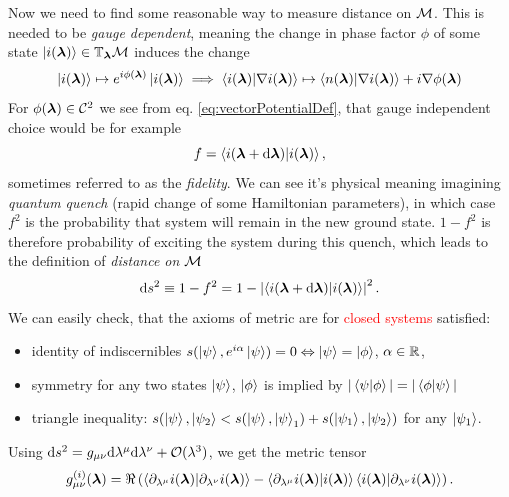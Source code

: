 Now we need to find some reasonable way to measure distance on $\mathcal{M}$. This is needed to be \emph{gauge dependent}, meaning the change in phase factor $\phi$ of some state $\ket{i({\bm\lambda})}\in \mathbb{T}_{\bm\lambda}\mathcal{M}$ induces the change 
\begin{equation}
    \ket{i({\bm\lambda})}\mapsto e^{i\phi({\bm\lambda})} \ket{i({\bm\lambda})} \implies \braket{i({\bm\lambda})|\nabla i({\bm\lambda})}\mapsto \braket{n({\bm\lambda})|\nabla i({\bm\lambda})} + i\nabla \phi({\bm\lambda}) 
\end{equation} 
For $\phi({\bm\lambda})\in \mathcal C^2$ we see from eq. \ref{eq:vectorPotentialDef}, that gauge independent choice would be for example
\begin{equation}
    f=\braket{i(\bm{{\bm\lambda}}+\mathrm{d}\bm{{\bm\lambda}})|i(\bm{{\bm\lambda}})},
\end{equation}
sometimes referred to as the \emph{fidelity}. We can see it's physical meaning imagining \emph{quantum quench} (rapid change of some Hamiltonian parameters), in which case $f^2$ is the probability that system will remain in the new ground state. $1-f^2$ is therefore probability of exciting the system during this quench, which leads to the definition of \emph{distance on $\mathcal{M}$}
\begin{equation}
    \mathrm{d} s^2 \equiv 1-f^2= 1-\left|\braket{i(\bm{{\bm\lambda}}+\mathrm{d}\bm{{\bm\lambda}})|i(\bm{{\bm\lambda}})}\right|^2.
\end{equation}
We can easily check, that the axioms of metric are for \textcolor{red}{closed systems} satisfied:
\begin{itemize}
    \item identity of indiscernibles $s(\ket{\psi},e^{i\alpha}\ket{\psi}) = 0 \Leftrightarrow \ket{\psi}=\ket{\phi}$, $\alpha\in\mathbb{R}$,
    \item symmetry for any two states $\ket{\psi}$, $\ket{\phi}$ is implied by $|\braket{\psi|\phi}|=|\braket{\phi|\psi}|$
    \item triangle inequality: $s(\ket{\psi},\ket{\psi_2} <s(\ket{\psi},\ket{\psi}_1) + s(\ket{\psi_1},\ket{\psi_2})$ for any $\ket{\psi_1}$.
\end{itemize}


Using $\mathrm{d} s^2 = g_{\mu\nu}\mathrm{d} \lambda^\mu \mathrm{d}\lambda^\nu+\mathcal{O}(\lambda^3)$, we get the metric tensor
\begin{equation}
    g_{\mu\nu}^{(i)}(\bm{{\bm\lambda}}) = \Re\left(\braket{\partial_{\lambda^\mu}i(\bm{{\bm\lambda}})|\partial_{\lambda^\nu}i(\bm{{\bm\lambda}})} - \braket{\partial_{\lambda^\mu}i(\bm{{\bm\lambda}})|i(\bm{{\bm\lambda}})}\braket{i(\bm{{\bm\lambda}})|\partial_{\lambda^\nu}i(\bm{{\bm\lambda}})}\right).
    \label{eq:geom.tensorDefinition}
\end{equation}

